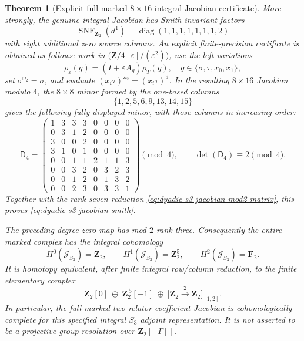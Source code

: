 \documentclass[11pt]{article}
\newtheorem{theorem}{Theorem}[section]
\theoremstyle{definition}
\begin{document}
\begin{theorem}[Explicit full-marked $8\times16$ integral Jacobian certificate]
More strongly, the genuine
\emph{integral} Jacobian has
Smith invariant factors
\begin{equation}\label{eq:dyadic-s3-jacobian-smith}
\boxed{\quad
\operatorname{SNF}_{\mathbf Z_2}(d^1)
=\operatorname{diag}
(1,1,1,1,1,1,1,2)
\quad}
\end{equation}
with eight additional zero
source columns.
An explicit finite-precision
certificate is obtained as follows:
work in
$\bigl(\mathbf Z/4[\varepsilon]/
(\varepsilon^2)\bigr)$, use the
left variations
\[
\rho_\varepsilon(g)
=(I+\varepsilon A_g)\rho_T(g),
\quad g\in\{\sigma,\tau,x_0,x_1\},
\]
set $\sigma^{\omega_2}=\sigma$,
and evaluate
$(x_i\tau)^{\omega_2}=(x_i\tau)^9$.
In the resulting $8\times16$
Jacobian modulo $4$, the
$8\times8$ minor formed by the
one-based columns
\begin{equation}\label{eq:dyadic-s3-jacobian-minor-columns}
\boxed{\qquad
\{1,2,5,6,9,13,14,15\}
\qquad}
\end{equation}
gives the following fully displayed
minor, with those columns in
increasing order:
\begin{equation}\label{eq:dyadic-s3-jacobian-mod4-minor}
\mathsf D_4=
\begin{pmatrix}
1&3&3&3&0&0&0&0\\
0&3&1&2&0&0&0&0\\
3&0&0&2&0&0&0&0\\
3&1&0&1&0&0&0&0\\
0&0&1&1&2&1&1&3\\
0&0&3&2&0&3&2&3\\
0&0&1&2&0&1&3&2\\
0&0&2&3&0&3&3&1
\end{pmatrix}
\pmod4,\qquad
\boxed{\det(\mathsf D_4)\equiv2\pmod4}.
\end{equation}
Together with
the rank-seven reduction
\eqref{eq:dyadic-s3-jacobian-mod2-matrix},
this proves
\eqref{eq:dyadic-s3-jacobian-smith}.

The preceding degree-zero map
has mod-$2$ rank three.
Consequently the entire marked
complex has the integral cohomology
\begin{equation}\label{eq:dyadic-s3-marked-cochain-ledger}
H^0(\mathcal J_{S_3})=\mathbf Z_2,\qquad
H^1(\mathcal J_{S_3})=\mathbf Z_2^5,\qquad
H^2(\mathcal J_{S_3})=\mathbf F_2.
\end{equation}
It is homotopy equivalent, after
finite integral row/column reduction,
to the finite elementary complex
\begin{equation}\label{eq:dyadic-s3-marked-smith-model}
\boxed{\quad
\mathbf Z_2[0]\ \oplus\
\mathbf Z_2^{\,5}[-1]\ \oplus\
\bigl[\mathbf Z_2
\xrightarrow{\ 2\ }\mathbf Z_2\bigr]_{[1,2]} .
\quad}
\end{equation}
In particular, the full marked
two-relator coefficient Jacobian
is \emph{cohomologically complete}
for this specified integral
$S_3$ \emph{adjoint} representation.
It is not asserted to be a
projective group resolution over
$\mathbf Z_2[[\Gamma]]$.
\end{theorem}
\end{document}
